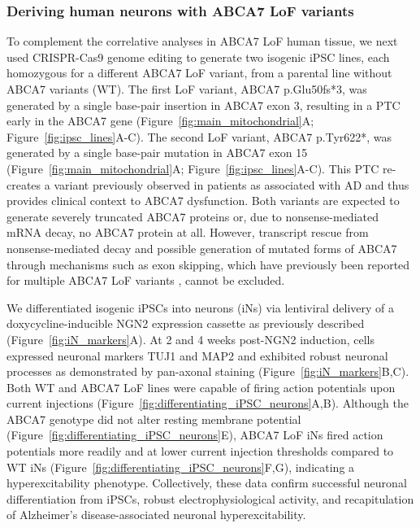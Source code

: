 \subsubsection{Deriving human neurons with ABCA7 LoF variants}
To complement the correlative analyses in ABCA7 LoF human tissue, we next used CRISPR-Cas9 genome editing to generate two isogenic iPSC lines, each homozygous for a different ABCA7 LoF variant, from a parental line without ABCA7 variants (WT). The first LoF variant, ABCA7 p.Glu50fs*3, was generated by a single base-pair insertion in ABCA7 exon 3, resulting in a PTC early in the ABCA7 gene (Figure~\ref{fig:main_mitochondrial}A; Figure~\ref{fig:ipsc_lines}A-C). The second LoF variant, ABCA7 p.Tyr622*, was generated by a single base-pair mutation in ABCA7 exon 15 (Figure~\ref{fig:main_mitochondrial}A; Figure~\ref{fig:ipsc_lines}A-C). This PTC re-creates a variant previously observed in patients as associated with AD \cite{Steinberg2015-mu} and thus provides clinical context to ABCA7 dysfunction. Both variants are expected to generate severely truncated ABCA7 proteins or, due to nonsense-mediated mRNA decay, no ABCA7 protein at all. However, transcript rescue from nonsense-mediated decay and possible generation of mutated forms of ABCA7 through mechanisms such as exon skipping, which have previously been reported for multiple ABCA7 LoF variants \cite{De_Roeck2017-hv}, cannot be excluded.

We differentiated isogenic iPSCs into neurons (iNs) via lentiviral delivery of a doxycycline-inducible NGN2 expression cassette as previously described \cite{Ho2016-kz} (Figure~\ref{fig:iN_markers}A). At 2 and 4 weeks post-NGN2 induction, cells expressed neuronal markers TUJ1 and MAP2 and exhibited robust neuronal processes as demonstrated by pan-axonal staining (Figure~\ref{fig:iN_markers}B,C). Both WT and ABCA7 LoF lines were capable of firing action potentials upon current injections (Figure~\ref{fig:differentiating_iPSC_neurons}A,B). Although the ABCA7 genotype did not alter resting membrane potential (Figure~\ref{fig:differentiating_iPSC_neurons}E), ABCA7 LoF iNs fired action potentials more readily and at lower current injection thresholds compared to WT iNs (Figure~\ref{fig:differentiating_iPSC_neurons}F,G), indicating a hyperexcitability phenotype. Collectively, these data confirm successful neuronal differentiation from iPSCs, robust electrophysiological activity, and recapitulation of Alzheimer's disease-associated neuronal hyperexcitability.


